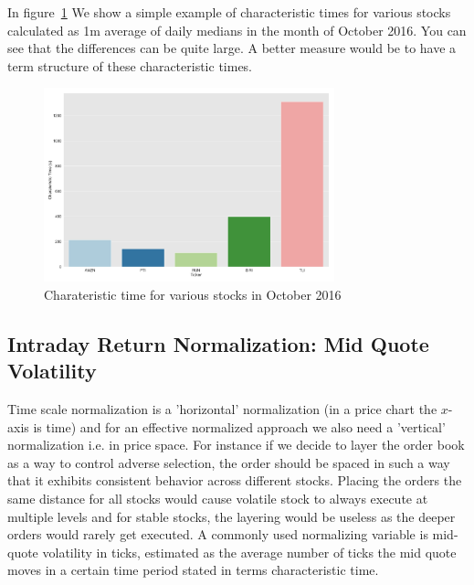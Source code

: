 In figure~\ref{fig:char_time} We show a simple example of characteristic times for various stocks calculated as 1m average of daily medians in the month of October 2016. You can see that the differences can be quite large. A better measure would be to have a term structure of these characteristic times.


	\begin{figure}[!ht]
	\centering
	\includegraphics[width=0.75\textwidth]{chapters/chapter_trade_data_models/figures/char_time.png} 
	\caption{Charateristic time for various stocks in October 2016 \label{fig:char_time}}
	\end{figure}



\subsection{Intraday Return Normalization: Mid Quote Volatility}

Time scale normalization is a 'horizontal' normalization (in a price chart the $x$-axis is time) and for an effective normalized approach we also need a 'vertical' normalization i.e. in price space. For instance if we decide to layer the order book as a way to control adverse selection, the order should be spaced in such a way that it exhibits consistent behavior across different stocks. Placing the orders the same distance for all stocks would cause volatile stock to always execute at multiple levels and for stable stocks, the layering would be useless as the deeper orders would rarely get executed. A commonly used normalizing variable is mid-quote volatility in ticks, estimated as the average number of ticks the mid quote moves in a certain time period stated in terms characteristic time. 


